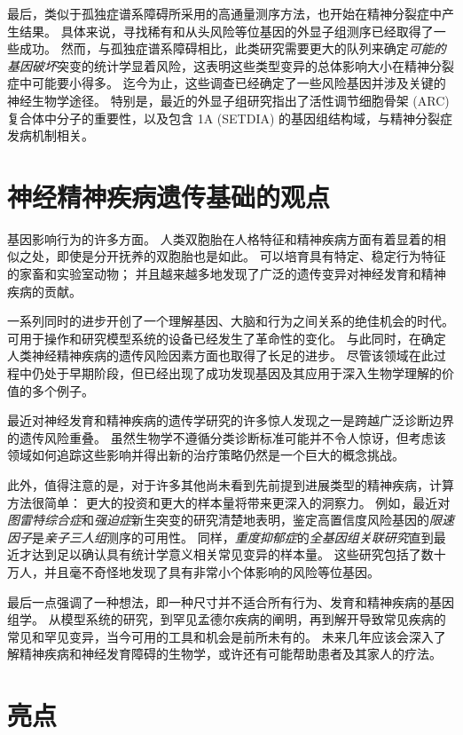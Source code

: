 最后，类似于孤独症谱系障碍所采用的高通量测序方法，也开始在精神分裂症中产生结果。
具体来说，寻找稀有和从头风险等位基因的外显子组测序已经取得了一些成功。
然而，与孤独症谱系障碍相比，此类研究需要更大的队列来确定\textit{可能的基因破坏}突变的统计学显着风险，这表明这些类型变异的总体影响大小在精神分裂症中可能要小得多。
迄今为止，这些调查已经确定了一些风险基因并涉及关键的神经生物学途径。
特别是，最近的外显子组研究指出了活性调节细胞骨架 (ARC) 复合体中分子的重要性，以及包含 1A (SETDIA) 的基因组结构域，与精神分裂症发病机制相关。



\section{神经精神疾病遗传基础的观点}

基因影响行为的许多方面。
人类双胞胎在人格特征和精神疾病方面有着显着的相似之处，即使是分开抚养的双胞胎也是如此。 
可以培育具有特定、稳定行为特征的家畜和实验室动物；
并且越来越多地发现了广泛的遗传变异对神经发育和精神疾病的贡献。


一系列同时的进步开创了一个理解基因、大脑和行为之间关系的绝佳机会的时代。
可用于操作和研究模型系统的设备已经发生了革命性的变化。
与此同时，在确定人类神经精神疾病的遗传风险因素方面也取得了长足的进步。
尽管该领域在此过程中仍处于早期阶段，但已经出现了成功发现基因及其应用于深入生物学理解的价值的多个例子。


最近对神经发育和精神疾病的遗传学研究的许多惊人发现之一是跨越广泛诊断边界的遗传风险重叠。 
虽然生物学不遵循分类诊断标准可能并不令人惊讶，但考虑该领域如何追踪这些影响并得出新的治疗策略仍然是一个巨大的概念挑战。


此外，值得注意的是，对于许多其他尚未看到先前提到进展类型的精神疾病，计算方法很简单：
更大的投资和更大的样本量将带来更深入的洞察力。 
例如，最近对\textit{图雷特综合症}和\textit{强迫症}新生突变的研究清楚地表明，鉴定高置信度风险基因的\textit{限速因子}是\textit{亲子三人组}测序的可用性。
同样，\textit{重度抑郁症}的\textit{全基因组关联研究}直到最近才达到足以确认具有统计学意义相关常见变异的样本量。 
这些研究包括了数十万人，并且毫不奇怪地发现了具有非常小个体影响的风险等位基因。


最后一点强调了一种想法，即一种尺寸并不适合所有行为、发育和精神疾病的基因组学。 
从模型系统的研究，到罕见孟德尔疾病的阐明，再到解开导致常见疾病的常见和罕见变异，当今可用的工具和机会是前所未有的。 
未来几年应该会深入了解精神疾病和神经发育障碍的生物学，或许还有可能帮助患者及其家人的疗法。


\section{亮点}

